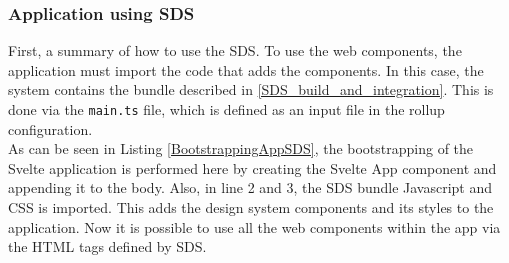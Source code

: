 \subsubsection{Application using \ac{SDS}}
First, a summary of how to use the \acl{SDS}. To use the web components, the application must import the code that adds the components. In this case, the system contains the bundle described in \ref{SDS_build_and_integration}. This is done via the \texttt{main.ts} file, which is defined as an input file in the rollup configuration. \\

As can be seen in Listing \ref{BootstrappingAppSDS}, the bootstrapping of the Svelte application is performed here by creating the Svelte App component and appending it to the body. Also, in line 2 and 3, the SDS bundle Javascript and \ac{CSS} is imported. This adds the design system components and its styles to the application. Now it is possible to use all the web components within the app via the \ac{HTML} tags defined by \ac{SDS}. \\

